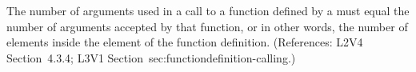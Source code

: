 The number of arguments used in a call to a function defined by a
\FunctionDefinition must equal the number of arguments accepted by that
function, or in other words, the number of  elements inside the
 element of the function definition.  (References: L2V4
Section~4.3.4; L3V1 Section~{sec:functiondefinition-calling}.)
